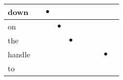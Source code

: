 \documentclass[landscape]{article}
\newcommand{\ssp}{\hspace{2pt}}
\newcommand{\mex}{\cellcolor{g}$\bullet$}
\begin{document}
\begin{tabular}{|l|p{10pt}|p{10pt}|p{10pt}|p{10pt}|p{10pt}|p{10pt}|p{10pt}|p{10pt}|p{10pt}|}
\hline
\ssp \cellcolor{ref1}down \ssp&\hspace{2pt}&\hspace{2pt}\mex&\hspace{2pt}&\hspace{2pt}&\hspace{2pt}&\hspace{2pt}&\hspace{2pt}&\hspace{2pt}&\hspace{2pt}\\
\hline
\ssp \cellcolor{ref2}on \ssp&\hspace{2pt}&\hspace{2pt}&\hspace{2pt}\mex&\hspace{2pt}&\hspace{2pt}&\hspace{2pt}&\hspace{2pt}&\hspace{2pt}&\hspace{2pt}\\
\hline
\ssp \cellcolor{ref3}the \ssp&\hspace{2pt}&\hspace{2pt}&\hspace{2pt}&\hspace{2pt}\mex&\hspace{2pt}&\hspace{2pt}&\hspace{2pt}&\hspace{2pt}&\hspace{2pt}\\
\hline
\ssp \cellcolor{ref7}handle \ssp&\hspace{2pt}&\hspace{2pt}&\hspace{2pt}&\hspace{2pt}&\hspace{2pt}&\hspace{2pt}&\hspace{2pt}&\hspace{2pt}\mex&\hspace{2pt}\\
\hline
\ssp to \ssp&\hspace{2pt}&\hspace{2pt}&\hspace{2pt}&\hspace{2pt}&\hspace{2pt}&\hspace{2pt}&\hspace{2pt}&\hspace{2pt}&\hspace{2pt}\\

\end{tabular}
\end{document}

